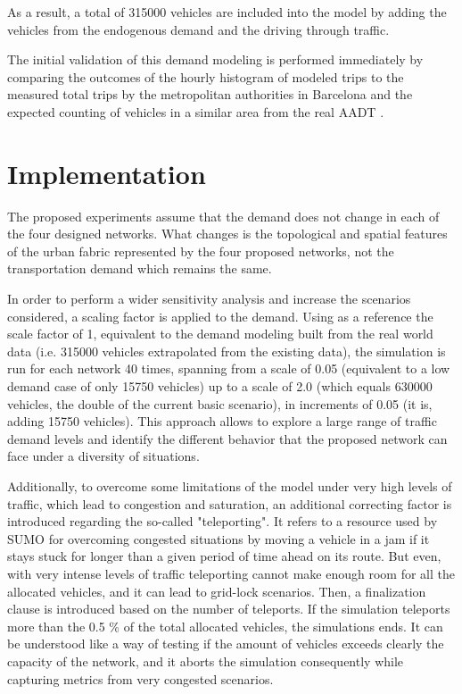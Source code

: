 \documentclass[11pt]{article}
\begin{document}
As a result, a total of 315000 vehicles are included into the model by adding the vehicles from the endogenous demand and the driving through traffic.

The initial validation of this demand modeling is performed immediately by comparing the outcomes of the hourly histogram of modeled trips to the measured total trips by the metropolitan authorities in Barcelona \citep{AreadeBarcelona.AutoritatdelTransportMetropolita2020} and the expected counting of vehicles in a similar area from the real AADT \citep{AjuntamentdeBarcelona2016}.

\section{Implementation}

The proposed experiments assume that the demand does not change in each of the four designed networks. What changes is the topological and spatial features of the urban fabric represented by the four proposed networks, not the transportation demand which remains the same. 

In order to perform a wider sensitivity analysis and increase the scenarios considered, a scaling factor is applied to the demand. Using as a reference the scale factor of 1, equivalent to the demand modeling built from the real world data (i.e. 315000 vehicles extrapolated from the existing data), the simulation is run for each network 40 times, spanning from a scale of 0.05 (equivalent to a low demand case of only 15750 vehicles) up to a scale of 2.0 (which equals 630000 vehicles, the double of the current basic scenario), in increments of 0.05 (it is, adding 15750 vehicles). This approach allows to explore a large range of traffic demand levels and identify the different behavior that the proposed network can face under a diversity of situations.

Additionally, to overcome some limitations of the model under very high levels of traffic, which lead to congestion and saturation, an additional correcting factor is introduced regarding the so-called "teleporting". It refers to a resource used by SUMO for overcoming congested situations by moving a vehicle in a jam if it stays stuck for longer than a given period of time ahead on its route. But even, with very intense levels of traffic teleporting cannot make enough room for all the allocated vehicles, and it can lead to grid-lock scenarios. Then, a finalization clause is introduced based on the number of teleports. If the simulation teleports more than the 0.5 \% of the total allocated vehicles, the simulations ends. It can be understood like a way of testing if the amount of vehicles exceeds clearly the capacity of the network, and it aborts the simulation consequently while capturing metrics from very congested scenarios.
\end{document}
